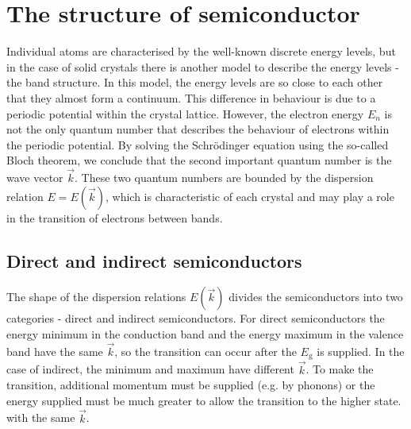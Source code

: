 \section{The structure of semiconductor}
Individual atoms are characterised by the well-known discrete energy levels, but in the case of solid crystals there is another model to describe the energy levels - the band structure. In this model, the energy levels are so close to each other that they almost form a continuum. This difference in behaviour is due to a periodic potential within the crystal lattice. However, the electron energy $E_{n}$ is not the only quantum number that describes the behaviour of electrons within the periodic potential. By solving the Schrödinger equation using the so-called Bloch theorem, we conclude that the second important quantum number is the wave vector $\vec{k}$. These two quantum numbers are bounded by the dispersion relation $E = E(\vec{k})$, which is characteristic of each crystal and may play a role in the transition of electrons between bands.



\subsection{Direct and indirect semiconductors}
The shape of the dispersion relations $E(\vec{k})$ divides the semiconductors into two categories - direct and indirect semiconductors. For direct semiconductors the energy minimum in the conduction band and the energy maximum in the valence band have the same $\vec{k}$, so the transition can occur after the $E_{\textrm{g}}$ is supplied. In the case of indirect, the minimum and maximum have different $\vec{k}$. To make the transition, additional momentum must be supplied (e.g. by phonons) or the energy supplied must be much greater to allow the transition to the higher state. with the same $\vec{k}$.  
 
